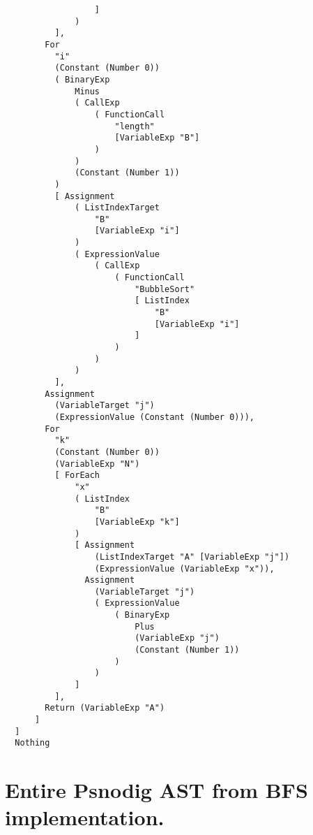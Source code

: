 \begin{lstlisting}
                  ]
              )
          ],
        For
          "i"
          (Constant (Number 0))
          ( BinaryExp
              Minus
              ( CallExp
                  ( FunctionCall
                      "length"
                      [VariableExp "B"]
                  )
              )
              (Constant (Number 1))
          )
          [ Assignment
              ( ListIndexTarget
                  "B"
                  [VariableExp "i"]
              )
              ( ExpressionValue
                  ( CallExp
                      ( FunctionCall
                          "BubbleSort"
                          [ ListIndex
                              "B"
                              [VariableExp "i"]
                          ]
                      )
                  )
              )
          ],
        Assignment
          (VariableTarget "j")
          (ExpressionValue (Constant (Number 0))),
        For
          "k"
          (Constant (Number 0))
          (VariableExp "N")
          [ ForEach
              "x"
              ( ListIndex
                  "B"
                  [VariableExp "k"]
              )
              [ Assignment
                  (ListIndexTarget "A" [VariableExp "j"])
                  (ExpressionValue (VariableExp "x")),
                Assignment
                  (VariableTarget "j")
                  ( ExpressionValue
                      ( BinaryExp
                          Plus
                          (VariableExp "j")
                          (Constant (Number 1))
                      )
                  )
              ]
          ],
        Return (VariableExp "A")
      ]
  ]
  Nothing
\end{lstlisting}

\section{Entire Psnodig AST from BFS implementation.}
\label{appendix:Entire Psnodig AST from BFS implementation.}

